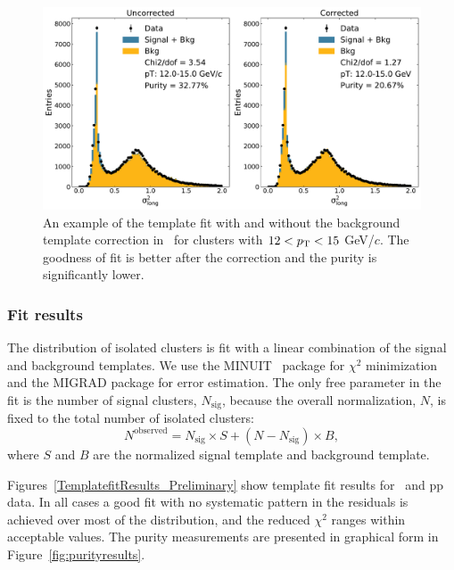 \FloatBarrier
\begin{figure}
    \centering
    \includegraphics[width=\textwidth]{Purity/correction-example-p-Pb-cluster_Lambda-12-15.pdf}
    \caption{An example of the template fit with and without the background template correction in \pPb~for clusters with $12 < p_{\mathrm{T}} < 15$ GeV/$c$. The goodness of fit is better after the correction and the purity is significantly lower.}
    \label{fig:purcorrectionexample}
\end{figure}


\subsubsection{Fit results}
\label{sec:fitresults}
The distribution of isolated clusters is fit with a linear combination of the signal and background templates. We use the \textsc{MINUIT}~\cite{James:1975dr} package for $\chi^{2}$ minimization and the \textsc{MIGRAD} package for error estimation. The only free parameter in the fit is the number of signal clusters, $N_{\mathrm{sig}}$, because the overall normalization, $N$, is fixed to the total number of isolated clusters:
\begin{equation}
N^{\mathrm{observed}} = N_{\mathrm{sig}}\times S + (N-N_{\mathrm{sig}})\times B,
\end{equation}
where $S$ and $B$ are the normalized signal template and background template. 


Figures~\ref{TemplatefitResults_Preliminary} show template fit results for \pPb~and pp data. In all cases a good fit with no systematic pattern in the residuals is achieved over most of the distribution, and the reduced $\chi^{2}$ ranges within acceptable values. The purity measurements are presented in graphical form in Figure~\ref{fig:purityresults}. 


